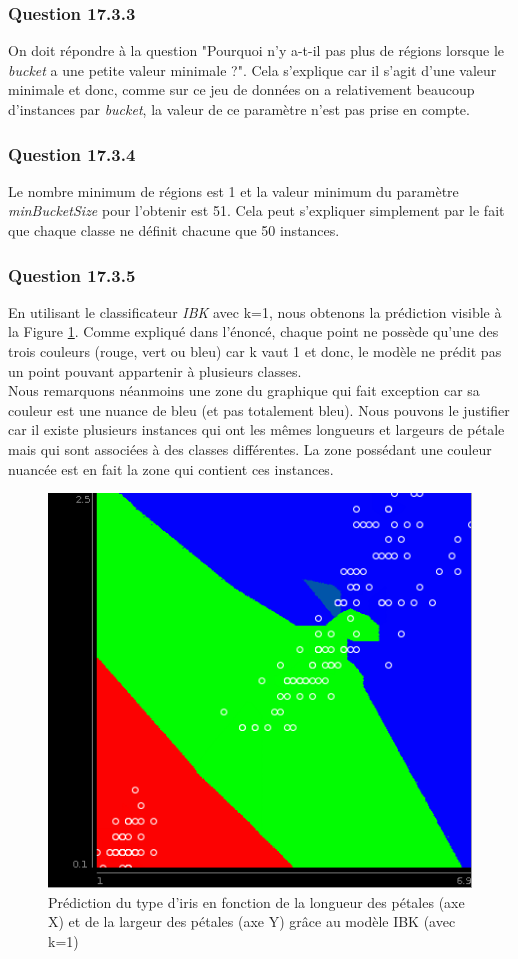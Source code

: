 \documentclass[11pt,a4paper]{article}
\begin{document}
			\subsubsection*{Question 17.3.3}
			
			On doit répondre à la question "Pourquoi n'y a-t-il pas plus de régions lorsque le \textit{bucket} a une petite valeur minimale ?". Cela s'explique car il s'agit d'une valeur minimale et donc, comme sur ce jeu de données on a relativement beaucoup d'instances par \textit{bucket}, la valeur de ce paramètre n'est pas prise en compte.
			
			\subsubsection*{Question 17.3.4}
			
			Le nombre minimum de régions est 1 et la valeur minimum du paramètre \textit{minBucketSize} pour l'obtenir est 51. Cela peut s'expliquer simplement par le fait que chaque classe ne définit chacune que 50 instances.
			
			\subsubsection*{Question 17.3.5}
			
			En utilisant le classificateur \textit{IBK} avec k=1, nous obtenons la prédiction visible à la Figure \ref{fig:iris:IB1}. Comme expliqué dans l'énoncé, chaque point ne possède qu'une des trois couleurs (rouge, vert ou bleu) car k vaut 1 et donc, le modèle ne prédit pas un point pouvant appartenir à plusieurs classes.\\
			
			Nous remarquons néanmoins une zone du graphique qui fait exception car sa couleur est une nuance de bleu (et pas totalement bleu). Nous pouvons le justifier car il existe plusieurs instances qui ont les mêmes longueurs et largeurs de pétale mais qui sont associées à des classes différentes. La zone possédant une couleur nuancée est en fait la zone qui contient ces instances.   
			
			\begin{figure}[]
				\centering
				\includegraphics[width=.5\textwidth]{iris_IB1}
				\caption{Prédiction du type d'iris en fonction de la longueur des pétales (axe X) et de la largeur des pétales (axe Y) grâce au modèle IBK (avec k=1)}
				\label{fig:iris:IB1}
			\end{figure}
			
\end{document}
